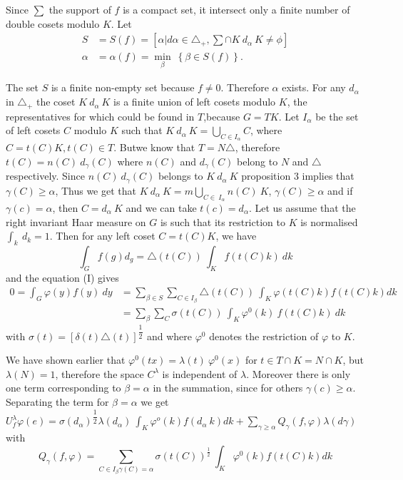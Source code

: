 Since $\sum$ the support of $f$ is a compact set, it intersect only a
finite number of double cosets modulo $K$. Let 
\begin{align*}
  S & = S(f) = \left[\alpha| d\alpha \in \triangle_+,\sum \cap K~d_\alpha~K
    \neq \phi\right]\\ 
  \alpha & = \alpha(f) = \min_{\beta}~ \left\{ \beta \in S(f)\right\}.
\end{align*}

The set $S$ is a finite non-empty set because $f \neq 0 $. Therefore
$\alpha$ exists. For any $d_{\alpha}$ in $\triangle_+$ the coset
$K~d_{\alpha}~K$ is a finite union of left cosets modulo $K$, the
representatives for which could be found in $T$,because $G = TK$. Let
$I_{\alpha}$ be the set of left cosets $C$ modulo $K$ such that
$K~d_{\alpha}~K = \bigcup\limits_{C\in I_\alpha} C$, where $C =
t(C)K,t(C)\in T$. But\pageoriginale we know that $T = N\triangle$, therefore $t(C) =
n(C)~d_{\gamma}(C)$ where $n(C)$ and $d_{\gamma}(C)$ belong to $N$ and
$\triangle$ respectively. Since $n(C)~d_{\gamma}(C)$ belongs to
$K~d_{\alpha}~K$ proposition 3 implies that $\gamma(C)\geq\alpha$,
Thus we get that $K~ d_\alpha~ K =m\bigcup\limits_{C \in ~I_\alpha}
n(C) ~K$, $\gamma (C) \geq \alpha$ and if $\gamma (c) = \alpha$, then
$C= d_{\alpha}~K$ and we can take $t(c) =
d_\alpha$. Let us assume that the right invariant Haar measure on $G$
is such that its restriction to $K$ is normalised \iec $\int_k~d_k =
1$. Then for any left coset $C = t(C)K$, we have 
$$
\int_G f(g) d_g = \triangle(t(C)) ~ \int_K f(t(C)k) ~ dk
$$
and the equation (I) gives
\begin{align*}
0 = \int_G \varphi(y)f(y)~dy & = \sum_{\beta\in S} \sum_{C \in
I_{\beta}}\triangle(t(C))~\int_K \varphi(t(C)k)f(t(C)k)dk\\ 
& = \sum_{\beta}\sum_C \sigma (t(C))~\int_K \varphi^0(k)~f(t(C)k)~ dk
\end{align*}
with $\sigma(t) = [\delta(t)\triangle(t)]^{\dfrac{1}{2}}$ and where
$\varphi^0$ denotes the restriction of $\varphi$ to $K$. 

We have shown earlier that $\varphi^0(tx) = \lambda(t)~\varphi^0(x)$
for $t \in T \cap K = N \cap K$, but $\lambda(N) = 1$, therefore the
space $C^\lambda$ is independent of $\lambda$. Moreover there is only
one term corresponding to $\beta = \alpha$ in the summation, since for
others $\gamma(c) \ge \alpha$. Separating the term for $\beta =
\alpha$ we get $U_f^{\lambda}\varphi(e) =
\sigma(d_\alpha)^{\dfrac{1}{2}}\lambda(d_\alpha)~\int_K\varphi^o(k)
f(d_\alpha ~ k)dk + \underset{\gamma\ge
  \alpha}{\sum}Q_{\gamma}(f,\varphi)\lambda(d\gamma)$ with  
\begin{equation}
  Q_{\gamma}(f,\varphi) = \sum_{C\in I_\beta \gamma(C) = \alpha}
  \sigma(t(C))^{\frac{1}{2}}~\int_K\varphi^0(k)f(t(C)k)dk
  \tag{II}\label{part2:chap2:sec4:eqII}  
\end{equation} 

